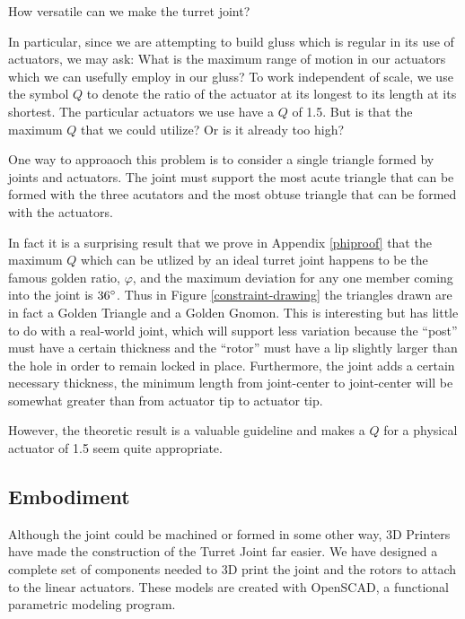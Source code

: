 \documentclass[12pt]{article}
\begin{document}

How versatile can we make the turret joint?

In particular, since we are attempting to build gluss which is regular in its use of actuators, we may ask:
What is the maximum range of motion in our
actuators which we can usefully employ in our gluss?
To work independent of scale, we use the symbol $Q$ to denote the ratio of the actuator at its
longest to its length at its shortest.
The particular actuators we use have a $Q$ of 1.5. But is that the maximum $Q$ that we could utilize? Or is
it already too high?

One way to approaoch this problem is to consider a single triangle formed by joints and actuators.
The joint must support the most acute triangle
that can be formed with the three acutators and the most obtuse triangle that can be formed with the actuators.

In fact it is a surprising result that we prove in Appendix \ref{phiproof} that the maximum $Q$ which can be utlized
by an ideal turret joint happens to be
the famous golden ratio, $\varphi$, and the maximum deviation for any one member coming
into the joint is $36\degree$.
Thus in Figure \ref{constraint-drawing} the triangles drawn are in fact a Golden Triangle and a Golden Gnomon.
This is interesting but has little to
do with a real-world joint, which will support less variation because the ``post'' must have a
certain thickness and the ``rotor'' must have a lip
slightly larger than the hole in order to remain locked in place.
Furthermore, the joint adds a certain necessary thickness, the minimum length
 from joint-center to joint-center will be somewhat greater than from actuator tip to actuator tip.

 However, the theoretic result is a valuable guideline and makes a $Q$ for a physical actuator of 1.5 seem quite appropriate.

 \subsection{Embodiment}

 Although the joint could be machined or formed in some other way,
 3D Printers have made the construction of the Turret Joint far easier.
 We have designed a complete set of components needed to 3D print the joint and the rotors to attach to
 the linear actuators. These models are created with OpenSCAD, a functional parametric modeling program.
\end{document}
